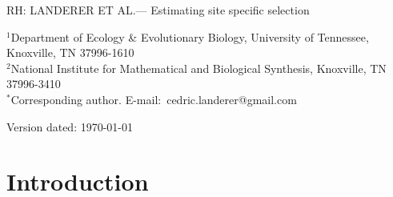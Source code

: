\documentclass[12pt]{article}
\begin{document}
\doublespacing
\linenumbers

\newcommand{\Lik}{\ensuremath{\mathcal{L}}\xspace}
\newcommand{\selac}{\emph{SelAC}\xspace}
\newcommand{\phydms}{\emph{phydms}\xspace}
\newcommand{\gy}{\emph{GY94}\xspace}
\newcommand{\ecoli}{\textit{E. coli}\xspace}


\newcommand{\beginsupplement}{%
  \setcounter{section}{19} %
  \setcounter{page}{1}
  \renewcommand{\thepage}{S\arabic{page}} %

  \setcounter{table}{0}
  \renewcommand{\thetable}{S\arabic{table}}%
  \setcounter{figure}{0}
  \renewcommand{\thefigure}{S\arabic{figure}}%
}


\noindent RH: LANDERER ET AL.--- Estimating site specific selection
\bigskip
\medskip
\begin{center}

\bigskip


\end{center}

\vfill

{\small
\noindent$^{1}$Department of Ecology \& Evolutionary Biology, University of Tennessee, Knoxville, TN 37996-1610\\
\noindent$^{2}$National Institute for Mathematical and Biological Synthesis, Knoxville, TN 37996-3410\\
\noindent$^{*}$Corresponding author. E-mail:~cedric.landerer@gmail.com
}

\vfill
\centerline{Version dated: \today}
\vfill
\newpage




\section*{Introduction}
\end{document}
